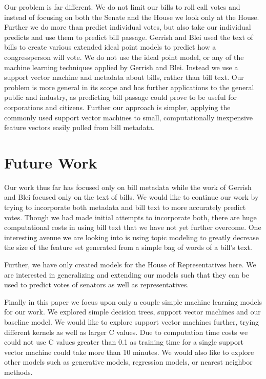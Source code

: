 \documentclass[11pt,letterpaper,twocolumn]{article}
\begin{document}
Our problem is far different. We do not limit our bills to roll call votes and instead of focusing on both the Senate and the House we look only at the House. Further we do more than predict individual votes, but also take our individual predicts and use them to predict bill passage. Gerrish and Blei used the text of bills to create various extended ideal point models to predict how a congressperson will vote. We do not use the ideal point model, or any of the machine learning techniques applied by Gerrish and Blei. Instead we use a support vector machine and metadata about bills, rather than bill text. Our problem is more general in its scope and has further applications to the general public and industry, as predicting bill passage could prove to be useful for  corporations and citizens. Further our approach is simpler, applying the commonly used support vector machines to small, computationally inexpensive feature vectors easily pulled from bill metadata.
 
\section{Future Work}

Our work thus far has focused only on bill metadata while the work of Gerrish and Blei focused only on the text of bills. We would like to continue our work by trying to incorporate both metadata and bill text to more accurately predict votes. Though we had made initial attempts to incorporate both, there are huge computational costs in using bill text that we have not yet further overcome. One interesting avenue we are looking into is using topic modeling to greatly decrease the size of the feature set generated from a simple bag of words of a bill's text.

Further, we have only created models for the House of Representatives here. We are interested in generalizing and extending our models such that they can be used to predict votes of senators as well as representatives. 

Finally in this paper we focus upon only a couple simple machine learning models for our work. We explored simple decision trees, support vector machines and our baseline model. We would like to explore support vector machines further, trying different kernels as well as larger C values. Due to computation time costs we could not use C values greater than 0.1 as training time for a single support vector machine could take more than 10 minutes. We would also like to explore other models such as generative models, regression models, or nearest neighbor methods.
\end{document}
